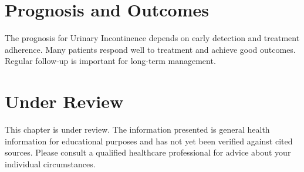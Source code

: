 \section*{Prognosis and Outcomes}
The prognosis for Urinary Incontinence depends on early detection and treatment adherence. Many patients respond well to treatment and achieve good outcomes. Regular follow-up is important for long-term management.
\section*{Under Review}
This chapter is under review. The information presented is general health information for educational purposes and has not yet been verified against cited sources. Please consult a qualified healthcare professional for advice about your individual circumstances.


\clearpage
